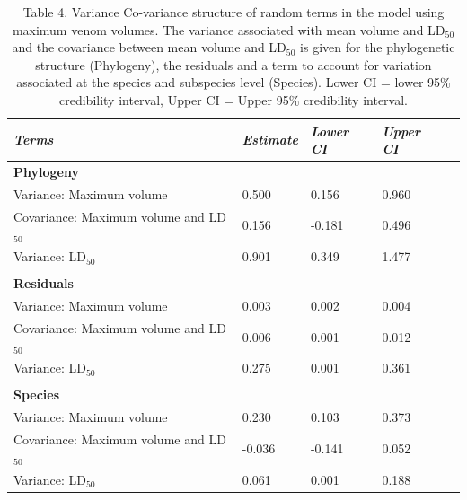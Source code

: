 \begin{table}[H]
  \centering
    \caption*{Table 4. Variance Co-variance structure of random terms in the model using maximum venom volumes. The variance associated with mean volume and LD$_{50}$ and the covariance between mean volume and LD$_{50}$ is given for the phylogenetic structure (Phylogeny), the residuals and a term to account for variation associated at the species and subspecies level (Species). Lower CI = lower 95\% credibility interval, Upper CI = Upper 95\% credibility interval.}
\begin{tabular}{*5l}    \toprule
\emph{Terms} & \emph{Estimate} & \emph{Lower CI} & \emph{Upper CI}\\\midrule
\textbf{Phylogeny} &   &   &  \\ 
Variance: Maximum volume & 0.500 & 0.156 & 0.960 \\
Covariance: Maximum volume and LD$_{50}$ & 0.156  &  -0.181  & 0.496 \\
Variance: LD$_{50}$ & 0.901 & 0.349 & 1.477 \\

 &   &   &  \\

\textbf{Residuals} &   &   &  \\ 
Variance: Maximum volume & 0.003 & 0.002 & 0.004 \\
Covariance: Maximum volume and LD$_{50}$ & 0.006  & 0.001  & 0.012 \\
Variance: LD$_{50}$ & 0.275 & 0.001 & 0.361 \\

 &   &   &  \\ 

\textbf{Species} &   &   &  \\ 
Variance: Maximum volume & 0.230 & 0.103 & 0.373 \\
Covariance: Maximum volume and LD$_{50}$ &  -0.036  &  -0.141  & 0.052 \\
Variance: LD$_{50}$ & 0.061 & 0.001 & 0.188 \\\bottomrule
 \hline
\end{tabular}
  \label{tbl:Table 4.}
\end{table}


